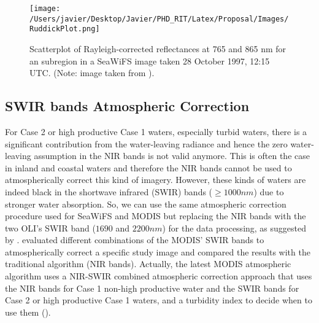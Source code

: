 \begin{figure}[htb]
  \centering
  \texttt{[image: /Users/javier/Desktop/Javier/PHD\_RIT/Latex/Proposal/Images/RuddickPlot.png]}
  \caption{Scatterplot of Rayleigh-corrected reflectances at 765 and 865 nm for an subregion in a SeaWiFS image taken 28 October 1997, 12:15 UTC.  (Note: image taken from \cite{Ruddick:2000bs}). \label{fig:ruddickplot} } 
\end{figure}

\subsection{SWIR bands Atmospheric Correction}\label{subsec:wang}

For Case 2 or high productive Case 1 waters, especially turbid waters, there is a significant contribution from the water-leaving radiance and hence the zero water-leaving assumption in the NIR bands is not valid anymore. This is often the case in inland and coastal waters and therefore the NIR bands cannot be used to atmospherically correct this kind of imagery. However, these kinds of waters are indeed black in the shortwave infrared (SWIR) bands ($\geq 1000nm$) due to stronger water absorption. So, we can use the same atmospheric correction procedure used for SeaWiFS and MODIS but replacing the NIR bands with the two OLI's SWIR band ($1690$ and $2200nm$) for the data processing, as suggested by \cite{Wang:2007,Wang:2005}. \cite{Wang:2007} evaluated different combinations of the MODIS' SWIR bands to atmospherically correct a specific study image and compared the results with the traditional algorithm (NIR bands). Actually, the latest MODIS atmospheric algorithm uses a NIR-SWIR combined atmospheric correction approach that uses the NIR bands for Case 1 non-high productive water and the SWIR bands for Case 2 or high productive Case 1 waters, and a turbidity index to decide when to use them (\cite{Wang:2007dz}). 

